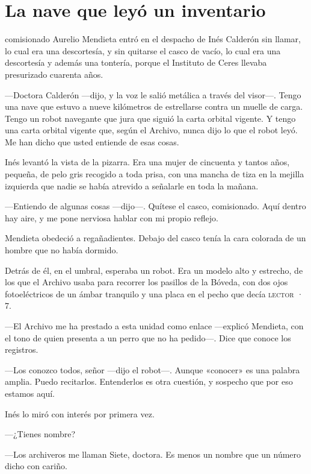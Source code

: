 \chapter{La nave que leyó un inventario}

 comisionado Aurelio Mendieta entró en el despacho de Inés Calderón sin llamar, lo cual era una descortesía, y sin quitarse el casco de vacío, lo cual era una descortesía y además una tontería, porque el Instituto de Ceres llevaba presurizado cuarenta años.

---Doctora Calderón ---dijo, y la voz le salió metálica a través del visor---\nobreak. Tengo una nave que estuvo a nueve kilómetros de estrellarse contra un muelle de carga. Tengo un robot navegante que jura que siguió la carta orbital vigente. Y tengo una carta orbital vigente que, según el Archivo, nunca dijo lo que el robot leyó. Me han dicho que usted entiende de esas cosas.

Inés levantó la vista de la pizarra. Era una mujer de cincuenta y tantos años, pequeña, de pelo gris recogido a toda prisa, con una mancha de tiza en la mejilla izquierda que nadie se había atrevido a señalarle en toda la mañana.

---Entiendo de algunas cosas ---dijo---\nobreak. Quítese el casco, comisionado. Aquí dentro hay aire, y me pone nerviosa hablar con mi propio reflejo.

Mendieta obedeció a regañadientes. Debajo del casco tenía la cara colorada de un hombre que no había dormido.

Detrás de él, en el umbral, esperaba un robot. Era un modelo alto y estrecho, de los que el Archivo usaba para recorrer los pasillos de la Bóveda, con dos ojos fotoeléctricos de un ámbar tranquilo y una placa en el pecho que decía \textsc{lector · 7}.

---El Archivo me ha prestado a esta unidad como enlace ---explicó Mendieta, con el tono de quien presenta a un perro que no ha pedido---\nobreak. Dice que conoce los registros.

---Los conozco todos, señor ---dijo el robot---\nobreak. Aunque «conocer» es una palabra amplia. Puedo recitarlos. Entenderlos es otra cuestión, y sospecho que por eso estamos aquí.

Inés lo miró con interés por primera vez.

---¿Tienes nombre?

---Los archiveros me llaman Siete, doctora. Es menos un nombre que un número dicho con cariño.


